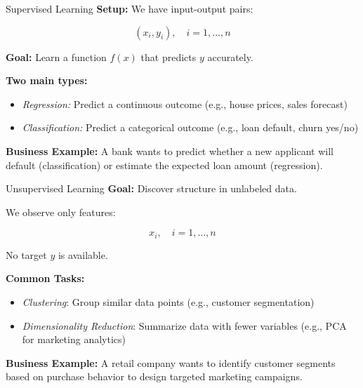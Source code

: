 \documentclass{beamer}
\begin{document}
\begin{frame}{Supervised Learning}
\textbf{Setup:} We have input-output pairs:

\[
(x_i, y_i), \quad i=1,\dots,n
\]

\textbf{Goal:} Learn a function $f(x)$ that predicts $y$ accurately.

\vspace{0.5cm}

\textbf{Two main types:}
\begin{itemize}
    \item \textit{Regression:} Predict a continuous outcome (e.g., house prices, sales forecast)
    \item \textit{Classification:} Predict a categorical outcome (e.g., loan default, churn yes/no)
\end{itemize}

\vspace{0.5cm}

\textbf{Business Example:}  
A bank wants to predict whether a new applicant will default (classification) or estimate the expected loan amount (regression).
\end{frame}

\begin{frame}{Unsupervised Learning}
\textbf{Goal:} Discover structure in unlabeled data.

\vspace{0.5cm}

We observe only features:

\[
x_i, \quad i=1,\dots,n
\]

No target $y$ is available.

\vspace{0.5cm}

\textbf{Common Tasks:}
\begin{itemize}
    \item \textit{Clustering}: Group similar data points (e.g., customer segmentation)
    \item \textit{Dimensionality Reduction}: Summarize data with fewer variables (e.g., PCA for marketing analytics)
\end{itemize}

\vspace{0.5cm}

\textbf{Business Example:}  
A retail company wants to identify customer segments based on purchase behavior to design targeted marketing campaigns.
\end{frame}
\end{document}
